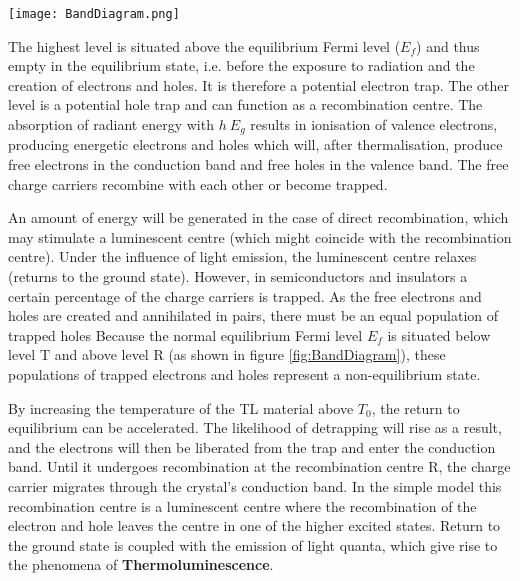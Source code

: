 \documentclass[../introduction.tex]{subfiles}
\begin{document}
        \begin{Figure}
            \centering
            \texttt{[image: BandDiagram.png]}
            \label{fig:BandDiagram}
        \end{Figure}
        
        The highest level is situated above the equilibrium Fermi level ($E_f$) and thus empty in the equilibrium state, 
        i.e. before the exposure to radiation and the creation of electrons and holes. It is therefore a potential 
        electron trap. The other level is a potential hole trap and can function as a recombination centre. 
        The absorption of radiant energy with $h \> E_g$ results in ionisation of valence electrons, producing 
        energetic electrons and holes which will, after thermalisation, produce free electrons in the conduction 
        band and free holes in the valence band. The free charge carriers recombine with each other or become trapped.

        An amount of energy will be generated in the case of direct recombination, which may stimulate a luminescent 
        centre (which might coincide with the recombination centre). Under the influence of light emission, the 
        luminescent centre relaxes (returns to the ground state).  However, in semiconductors and insulators a
        certain percentage of the charge carriers is trapped. As the free electrons and holes are created and annihilated
        in pairs, there must be an equal population of trapped holes Because the normal equilibrium Fermi level $E_f$ is
        situated below level T and above level R (as shown in figure \ref{fig:BandDiagram}), these populations of
        trapped electrons and holes represent a non-equilibrium state.

        By increasing the temperature of the TL material above $T_0$, the return to equilibrium can be accelerated. 
        The likelihood of detrapping will rise as a result, and the electrons will then be liberated from the trap and 
        enter the conduction band. Until it undergoes recombination at the recombination centre R, the charge carrier 
        migrates through the crystal's conduction band. In the simple model this recombination centre is a luminescent
        centre where the recombination of the electron and hole leaves the centre in one of the higher excited states. 
        Return to the ground state is coupled with the emission of light quanta, which give rise to the phenomena of 
        \textbf{Thermoluminescence}.
\end{document}
